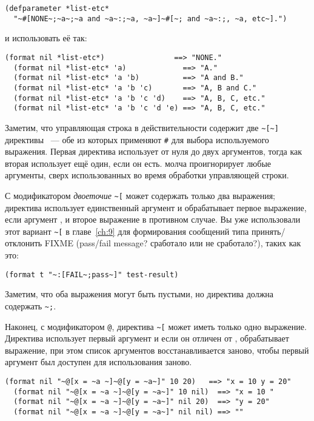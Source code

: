 \begin{lstlisting}
(defparameter *list-etc*
  "~#[NONE~;~a~;~a and ~a~:;~a, ~a~]~#[~; and ~a~:;, ~a, etc~].")
\end{lstlisting}

и использовать её так:

\begin{lstlisting}[style=lisprepl]
  (format nil *list-etc*)                ==> "NONE."
  (format nil *list-etc* 'a)             ==> "A."
  (format nil *list-etc* 'a 'b)          ==> "A and B."
  (format nil *list-etc* 'a 'b 'c)       ==> "A, B and C."
  (format nil *list-etc* 'a 'b 'c 'd)    ==> "A, B, C, etc."
  (format nil *list-etc* 'a 'b 'c 'd 'e) ==> "A, B, C, etc."
\end{lstlisting}

Заметим, что управляющая строка в действительности содержит две \lstinline!~[~]! директивы
~--- обе из которых применяют \lstinline!#! для выбора используемого выражения. Первая
директива использует от нуля до двух аргументов, тогда как вторая использует ещё один,
если он есть.  молча проигнорирует любые аргументы, сверх использованных во
время обработки управляющей строки.

С модификатором \textit{двоеточие} \lstinline!~[! может содержать только два выражения;
директива использует единственный аргумент и обрабатывает первое выражение, если аргумент
, и второе выражение в противном случае. Вы уже использовали этот вариант
\lstinline!~[! в главе~\ref{ch:9} для формирования сообщений типа принять/отклонить FIXME
  (pass/fail message? сработало или не сработало?), таких как это:

\begin{lstlisting}
(format t "~:[FAIL~;pass~]" test-result)
\end{lstlisting}

Заметим, что оба выражения могут быть пустыми, но директива должна содержать
\lstinline!~;!.

Наконец, с модификатором \lstinline!@!, директива \lstinline!~[! может иметь только одно
выражение. Директива использует первый аргумент и если он отличен от ,
обрабатывает выражение, при этом список аргументов восстанавливается заново, чтобы первый
аргумент был доступен для использования заново.

\begin{lstlisting}[style=lisprepl]
  (format nil "~@[x = ~a ~]~@[y = ~a~]" 10 20)   ==> "x = 10 y = 20"
  (format nil "~@[x = ~a ~]~@[y = ~a~]" 10 nil)  ==> "x = 10 "
  (format nil "~@[x = ~a ~]~@[y = ~a~]" nil 20)  ==> "y = 20"
  (format nil "~@[x = ~a ~]~@[y = ~a~]" nil nil) ==> ""
\end{lstlisting}

